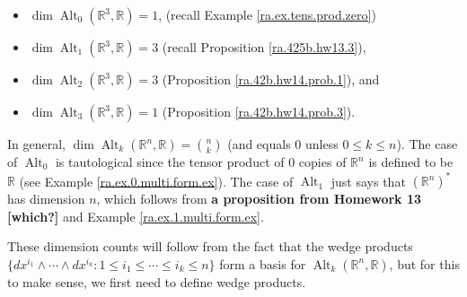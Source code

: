 \begin{itemize}

\item \(\operatorname{dim} \operatorname{Alt}_0(\mathbb{R}^3, \mathbb{R}) = 1\), (recall Example \ref{ra.ex.tens.prod.zero})

\item \(\operatorname{dim} \operatorname{Alt}_1(\mathbb{R}^3, \mathbb{R}) = 3\) (recall Proposition \ref{ra.425b.hw13.3}),

\item \(\operatorname{dim} \operatorname{Alt}_2(\mathbb{R}^3, \mathbb{R}) = 3\) (Proposition \ref{ra.42b.hw14.prob.1}), and

\item \(\operatorname{dim} \operatorname{Alt}_3(\mathbb{R}^3, \mathbb{R}) = 1\) (Proposition \ref{ra.42b.hw14.prob.3}).

\end{itemize}

In general, \(\operatorname{dim} \operatorname{Alt}_k(\mathbb{R}^n, \mathbb{R}) = \binom{n}{k}\) (and equals 0 unless \(0 \leq k \leq n\)). The case of \( \operatorname{Alt}_0\) is tautological since the tensor product of 0 copies of \(\mathbb{R}^n\) is defined to be \(\mathbb{R}\) (see Example \ref{ra.ex.0.multi.form.ex}). The case of \(\operatorname{Alt}_1\) just says that \((\mathbb{R}^n)^*\) has dimension \(n\), which follows from \textbf{a proposition from Homework 13 [which?]} and Example \ref{ra.ex.1.multi.form.ex}.

These dimension counts will follow from the fact that the wedge products \(\{dx^{i_1} \wedge \cdots \wedge dx^{i_k} : 1 \leq i_1 \leq \cdots \leq i_k \leq n\}\) form a basis for \(\operatorname{Alt}_k(\mathbb{R}^n, \mathbb{R})\), but for this to make sense, we first need to define wedge products.

